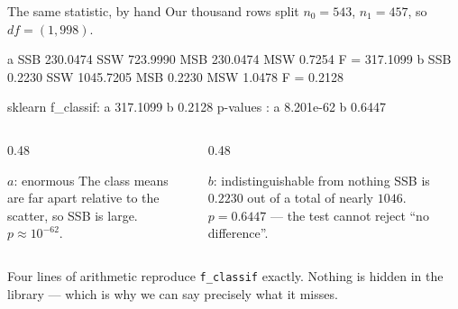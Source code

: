\documentclass[aspectratio=169]{beamer}
\begin{document}
\begin{frame}[fragile,shrink=6]{The same statistic, by hand}
Our thousand rows split $n_0 = 543$, $n_1 = 457$, so $df = (1, 998)$.
\begin{outblk}
a    SSB   230.0474  SSW   723.9990  MSB  230.0474  MSW  0.7254  F =  317.1099
b    SSB     0.2230  SSW  1045.7205  MSB    0.2230  MSW  1.0478  F =    0.2128

sklearn f_classif:  a 317.1099   b 0.2128
p-values         :  a 8.201e-62   b 0.6447
\end{outblk}
\vspace{0.2em}
\begin{columns}[T]
  \begin{column}{0.48\textwidth}
    \begin{exampleblock}{$a$: enormous}
      \small The class means are far apart relative to the scatter, so
      SSB is large. $p \approx 10^{-62}$.
    \end{exampleblock}
  \end{column}
  \begin{column}{0.48\textwidth}
    \begin{alertblock}{$b$: indistinguishable from nothing}
      \small SSB is $0.2230$ out of a total of nearly $1046$. $p = 0.6447$ ---
      the test cannot reject ``no difference''.
    \end{alertblock}
  \end{column}
\end{columns}
\vspace{0.2em}
\begin{center}\small
  Four lines of arithmetic reproduce \texttt{f\_classif} exactly. Nothing is
  hidden in the library --- which is why we can say precisely what it misses.
\end{center}
\end{frame}
\end{document}
